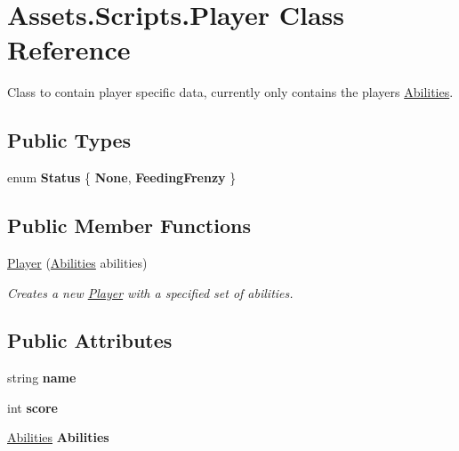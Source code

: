 \hypertarget{class_assets_1_1_scripts_1_1_player}{}\section{Assets.\+Scripts.\+Player Class Reference}
\label{class_assets_1_1_scripts_1_1_player}


Class to contain player specific data, currently only contains the player\textquotesingle{}s \hyperlink{class_abilities}{Abilities}.  


\subsection*{Public Types}
\begin{DoxyCompactItemize}
\item 
enum {\bfseries Status} \{ {\bfseries None}, 
{\bfseries Feeding\+Frenzy}
 \}\hypertarget{class_assets_1_1_scripts_1_1_player_a2f2331b06a502c4d8adc9fdedac01bcf}{}\label{class_assets_1_1_scripts_1_1_player_a2f2331b06a502c4d8adc9fdedac01bcf}

\end{DoxyCompactItemize}
\subsection*{Public Member Functions}
\begin{DoxyCompactItemize}
\item 
\hyperlink{class_assets_1_1_scripts_1_1_player_a001824ef0da3d6624bc15db5673aa332}{Player} (\hyperlink{class_abilities}{Abilities} abilities)
\begin{DoxyCompactList}\small\item\em Creates a new \hyperlink{class_assets_1_1_scripts_1_1_player}{Player} with a specified set of abilities. \end{DoxyCompactList}\end{DoxyCompactItemize}
\subsection*{Public Attributes}
\begin{DoxyCompactItemize}
\item 
string {\bfseries name}\hypertarget{class_assets_1_1_scripts_1_1_player_acac0ebc42e75d8491ec8ecbb6ce4edd4}{}\label{class_assets_1_1_scripts_1_1_player_acac0ebc42e75d8491ec8ecbb6ce4edd4}

\item 
int {\bfseries score}\hypertarget{class_assets_1_1_scripts_1_1_player_a6304232fccdb5f6f8179ff21c0d5091e}{}\label{class_assets_1_1_scripts_1_1_player_a6304232fccdb5f6f8179ff21c0d5091e}

\item 
\hyperlink{class_abilities}{Abilities} {\bfseries Abilities}\hypertarget{class_assets_1_1_scripts_1_1_player_ab68bfaafe801abfcf17fd2035beb7221}{}\label{class_assets_1_1_scripts_1_1_player_ab68bfaafe801abfcf17fd2035beb7221}

\end{DoxyCompactItemize}
